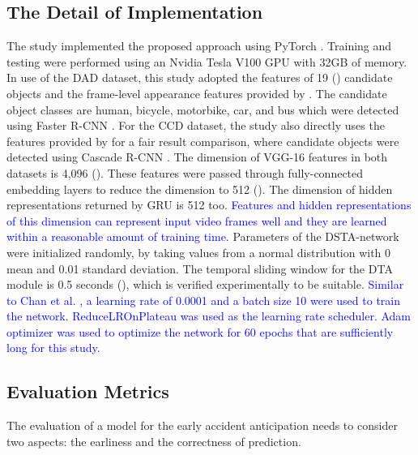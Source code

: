 \documentclass[journal]{IEEEtran}
\begin{document}
\subsection{The Detail of Implementation}
The study implemented the proposed approach using PyTorch \cite{paszke2019pytorch}. Training and testing were performed using an Nvidia Tesla V100 GPU with 32GB of memory. In use of the DAD dataset, this study adopted the features of 19 () candidate objects and the frame-level appearance features provided by \cite{chan2016anticipating}. The candidate object classes are human, bicycle, motorbike, car, and bus which were detected using Faster R-CNN \cite{ren2015faster}. For the CCD dataset, the study also directly uses the features provided by \cite{bao2020uncertainty} for a fair result comparison, where candidate objects were detected using Cascade R-CNN \cite{cai2018cascade}. The dimension of VGG-16 features in both datasets is 4,096 (). These features were passed through fully-connected embedding layers to reduce the dimension to 512 (). The dimension of hidden representations returned by GRU is 512 too. \textcolor{blue}{Features and hidden representations of this dimension can represent input video frames well and they are learned within a reasonable amount of training time}. Parameters of the DSTA-network were initialized randomly, by taking values from a normal distribution with 0 mean and 0.01 standard deviation.
The temporal sliding window for the DTA module is 0.5 seconds (), which is verified experimentally to be suitable. 
\textcolor{blue}{Similar to Chan et al. \cite{chan2016anticipating}, a learning rate of 0.0001 and a batch size 10 were used to train the network. ReduceLROnPlateau was used as the learning rate scheduler. Adam optimizer was used to optimize the network for 60 epochs that are sufficiently long for this study.}


\subsection{Evaluation Metrics}
The evaluation of a model for the early accident anticipation needs to consider two aspects: the earliness and the correctness of prediction. 
\end{document}
